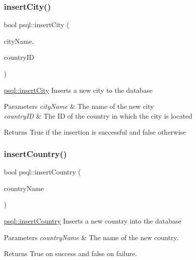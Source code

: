 \subsubsection{\texorpdfstring{insertCity()}{insertCity()}}
{\footnotesize\ttfamily bool psql\+::insert\+City (\begin{DoxyParamCaption}\item[{Q\+String}]{city\+Name,  }\item[{int}]{country\+ID }\end{DoxyParamCaption})}



\mbox{\hyperlink{classpsql_a767b85014d9df3eac148730f18888d6d}{psql\+::insert\+City}} Inserts a new city to the database 


\begin{DoxyParams}{Parameters}
{\em city\+Name} & The name of the new city \\
\hline
{\em country\+ID} & The ID of the country in which the city is located \\
\hline
\end{DoxyParams}
\begin{DoxyReturn}{Returns}
True if the insertion is successful and false otherwise 
\end{DoxyReturn}
\mbox{\label{classpsql_ab3b5934ce3fbc4be1730d990d4142893}} 
\subsubsection{\texorpdfstring{insertCountry()}{insertCountry()}}
{\footnotesize\ttfamily bool psql\+::insert\+Country (\begin{DoxyParamCaption}\item[{Q\+String}]{country\+Name }\end{DoxyParamCaption})}



\mbox{\hyperlink{classpsql_ab3b5934ce3fbc4be1730d990d4142893}{psql\+::insert\+Country}} Inserts a new country into the database 


\begin{DoxyParams}{Parameters}
{\em country\+Name} & The name of the new country. \\
\hline
\end{DoxyParams}
\begin{DoxyReturn}{Returns}
True on success and false on failure. 
\end{DoxyReturn}
\mbox{\label{classpsql_a601ee0bdc9430b1d674a857f7c94b767}} 
